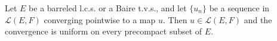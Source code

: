 Let $E$ be a barreled l.c.s. or a Baire t.v.s., and let $\{u_n\}$ be a sequence in $\mathcal{L}(E, F)$ converging pointwise to a map $u$. Then $u \in \mathcal{L}(E, F)$ and the convergence is uniform on every precompact subset of $E$.
